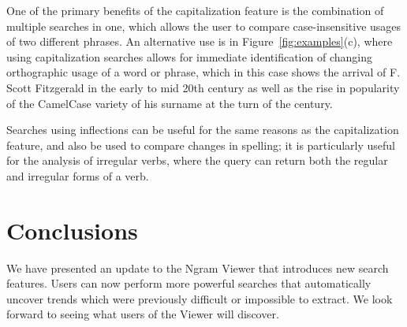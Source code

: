 \documentclass[11pt,a4paper]{article}
\newcommand{\eat}[1]{\ignorespaces}
\begin{document}
One of the primary benefits of the capitalization feature is the combination of multiple searches in one, which allows the user to compare case-insensitive usages of two different phrases. An alternative use is in Figure~\ref{fig:examples}(c), where using capitalization searches allows for immediate identification of changing orthographic usage of a word or phrase, which in this case shows the arrival of F. Scott Fitzgerald in the early to mid 20th century as well as the rise in popularity of the CamelCase variety of his surname at the turn of the century.

Searches using inflections can be useful for the same reasons as the capitalization feature, and also be used to compare changes in spelling; it is particularly useful for the analysis of irregular verbs, where the query can return both the regular and irregular forms of a verb.

\section{Conclusions}
We have presented an update to the Ngram Viewer that introduces new search features. Users can now perform more powerful searches that automatically uncover trends which were previously difficult or impossible to extract. We look forward to seeing what users of the Viewer will discover.

\eat{\section{Acknowledgements}
We would like to thank John DeNero, ...}



\end{document}
